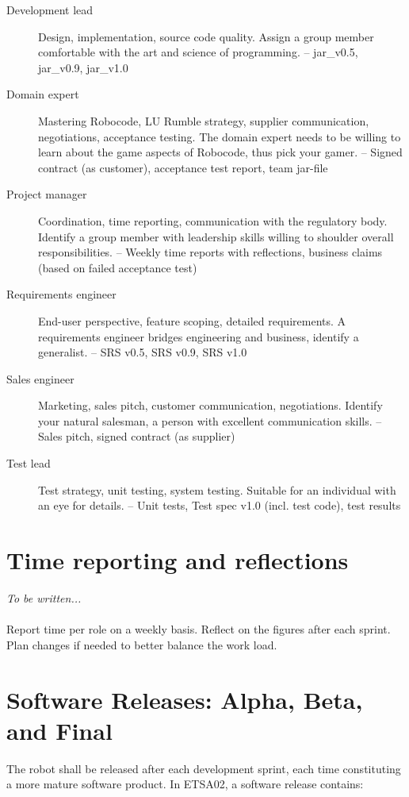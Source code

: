 \documentclass{scrreprt}
\begin{document}
\begin{description}
\item[Development lead] Design, implementation, source code quality. Assign a group member comfortable with the art and science of programming. -- jar_v0.5, jar_v0.9, jar_v1.0
\item[Domain expert] Mastering Robocode, LU Rumble strategy, supplier communication, negotiations, acceptance testing. The domain expert needs to be willing to learn about the game aspects of Robocode, thus pick your gamer. -- Signed contract (as customer), acceptance test report, team jar-file
\item[Project manager] Coordination, time reporting, communication with the regulatory body. Identify a group member with leadership skills willing to shoulder overall responsibilities. -- Weekly time reports with reflections, business claims (based on failed acceptance test)
\item[Requirements engineer] End-user perspective, feature scoping, detailed requirements. A requirements engineer bridges engineering and business, identify a generalist. -- SRS v0.5, SRS v0.9, SRS v1.0
\item[Sales engineer] Marketing, sales pitch, customer communication, negotiations. Identify your natural salesman, a person with excellent communication skills. -- Sales pitch, signed contract (as supplier)
\item[Test lead] Test strategy, unit testing, system testing. Suitable for an individual with an eye for details. -- Unit tests, Test spec v1.0 (incl. test code), test results
\end{description}

\section{Time reporting and reflections} \label{sec:time}
\emph{To be written...}\\\\
Report time per role on a weekly basis. Reflect on the figures after each sprint. Plan changes if needed to better balance the work load.

\section{Software Releases: Alpha, Beta, and Final}
The robot shall be released after each development sprint, each time constituting a more mature software product. In ETSA02, a software release contains:
\end{document}
